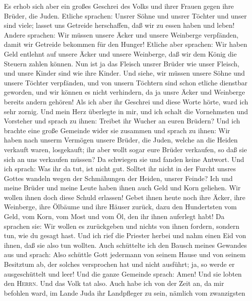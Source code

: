  Es erhob sich aber ein großes Geschrei des Volks und
ihrer Frauen gegen ihre Brüder, die Juden.  Etliche
sprachen: Unsrer Söhne und unsrer Töchter und unser sind viele; lasset
uns Getreide herschaffen, daß wir zu essen haben und leben!
 Andere sprachen: Wir müssen unsere Äcker und unsere
Weinberge verpfänden, damit wir Getreide bekommen für den Hunger!
 Etliche aber sprachen: Wir haben Geld entlehnt auf unsere
Äcker und unsere Weinberge, daß wir dem König die Steuern zahlen können.
 Nun ist ja das Fleisch unsrer Brüder wie unser Fleisch,
und unsre Kinder sind wie ihre Kinder. Und siehe, wir müssen unsere
Söhne und unsere Töchter verpfänden, und von unsern Töchtern sind schon
etliche dienstbar geworden, und wir können es nicht verhindern, da ja
unsre Äcker und Weinberge bereits andern gehören!  Als ich
aber ihr Geschrei und diese Worte hörte, ward ich sehr zornig.
 Und mein Herz überlegte in mir, und ich schalt die
Vornehmsten und Vorsteher und sprach zu ihnen: Treibet ihr Wucher an
euren Brüdern? Und ich brachte eine große Gemeinde wider sie zusammen
und sprach zu ihnen:  Wir haben nach unserm Vermögen
unsere Brüder, die Juden, welche an die Heiden verkauft waren,
losgekauft; ihr aber wollt sogar eure Brüder verkaufen, so daß sie sich
an uns verkaufen müssen? Da schwiegen sie und fanden keine Antwort.
 Und ich sprach: Was ihr da tut, ist nicht gut. Solltet
ihr nicht in der Furcht unsres Gottes wandeln wegen der Schmähungen der
Heiden, unsrer Feinde?  Ich und meine Brüder und meine
Leute haben ihnen auch Geld und Korn geliehen. Wir wollen ihnen doch
diese Schuld erlassen!  Gebet ihnen heute noch ihre
Äcker, ihre Weinberge, ihre Ölbäume und ihre Häuser zurück, dazu den
Hundertsten vom Geld, vom Korn, vom Most und vom Öl, den ihr ihnen
auferlegt habt!  Da sprachen sie: Wir wollen es
zurückgeben und nichts von ihnen fordern, sondern tun, wie du gesagt
hast. Und ich rief die Priester herbei und nahm einen Eid von ihnen, daß
sie also tun wollten.  Auch schüttelte ich den Bausch
meines Gewandes aus und sprach: Also schüttle Gott jedermann von seinem
Hause und von seinem Besitztum ab, der solches versprochen hat und nicht
ausführt; ja, so werde er ausgeschüttelt und leer! Und die ganze
Gemeinde sprach: Amen! Und sie lobten den \textsc{Herrn}. Und das Volk
tat also.  Auch habe ich von der Zeit an, da mir befohlen
ward, im Lande Juda ihr Landpfleger zu sein, nämlich vom zwanzigsten
